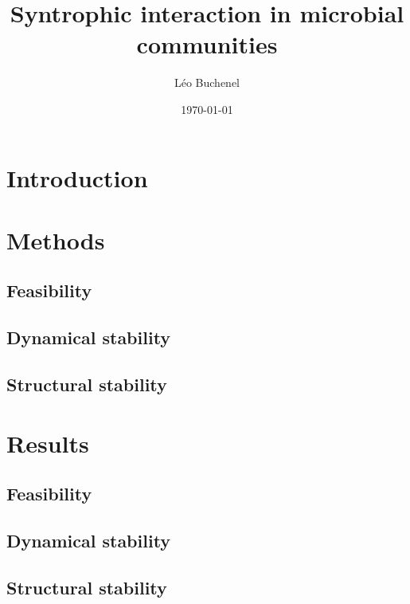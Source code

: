 \documentclass[12pt, titlepage, twoside, openright]{report}
\begin{document}
  \title{Syntrophic interaction in microbial communities}
  \author{L\'eo Buchenel}
  \date{\today}
  \maketitle
  \tableofcontents
  \chapter{Introduction}
  

  \chapter{Methods}
  \section{Feasibility}\label{sec : methods feasibility}
  
  \FloatBarrier
  \newpage
  \section{Dynamical stability}\label{sec : methods dynamical stability}
  
  \FloatBarrier
  \newpage
  \section{Structural stability}
  
  \chapter{Results}\label{chapter : results}
  \section{Feasibility}
  
  \FloatBarrier
  \newpage
  \section{Dynamical stability}
  
  \FloatBarrier
  \newpage
  \section{Structural stability}
  
\end{document}
